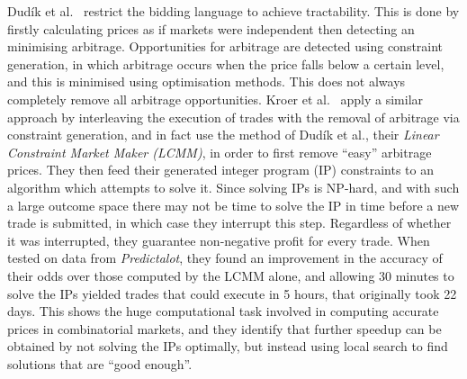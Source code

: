 Dud\'ik et al.~\cite{Dudik2012} restrict the bidding language to achieve
tractability. This is done by firstly calculating prices as if markets were
independent then detecting an minimising arbitrage. Opportunities for arbitrage
are detected using constraint generation, in which arbitrage occurs when the
price falls below a certain level, and this is minimised using optimisation
methods. This does not always completely remove all arbitrage opportunities.
Kroer et al.~\cite{Kroer2016} apply a similar approach by interleaving the
execution of trades with the removal of arbitrage via constraint generation,
and in fact use the method of Dud\'ik et al., their \emph{Linear Constraint
Market Maker (LCMM)}, in order to first remove ``easy'' arbitrage prices. They then
feed their generated integer program (IP) constraints to an algorithm which
attempts to solve it. Since solving IPs is NP-hard, and with such a large
outcome space there may not be time to solve the IP in time before a new trade
is submitted, in which case they interrupt this step. Regardless of whether it
was interrupted, they guarantee non-negative profit for every trade. When
tested on data from \emph{Predictalot}, they found an improvement in the
accuracy of their odds over those computed by the LCMM alone, and allowing 30
minutes to solve the IPs yielded trades that could execute in 5 hours, that
originally took 22 days. This shows the huge computational task involved in
computing accurate prices in combinatorial markets, and they identify that
further speedup can be obtained by not solving the IPs optimally, but instead
using local search to find solutions that are ``good enough''.
